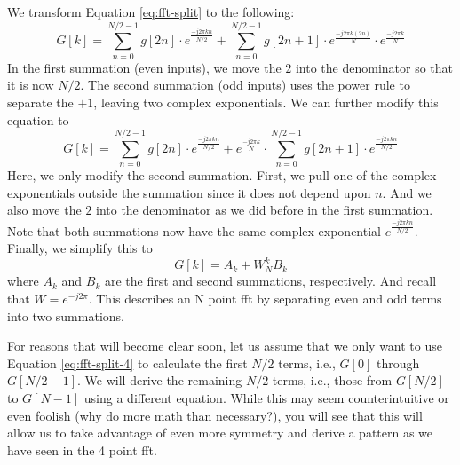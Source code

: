 We transform Equation \ref{eq:fft-split} to the following:
\begin{equation}
G[k] = \displaystyle\sum\limits_{n=0}^{N/2-1} g[2n] \cdot e^{\frac{-j 2 \pi k n}{N/2}} + \displaystyle\sum\limits_{n=0}^{N/2-1} g[2n+1] \cdot e^{\frac{-j 2 \pi k (2n)}{N}} \cdot e^{\frac{-j 2 \pi k}{N}}
\label{eq:fft-split-2}
\end{equation}
In the first summation (even inputs), we move the $2$ into the denominator so that it is now $N/2$. The second summation (odd inputs) uses the power rule to separate the $+1$, leaving two complex exponentials. We can further modify this equation to
\begin{equation}
G[k] = \displaystyle\sum\limits_{n=0}^{N/2-1} g[2n] \cdot e^{\frac{-j 2 \pi k n}{N/2}} + e^{\frac{-j 2 \pi k}{N}} \cdot \displaystyle\sum\limits_{n=0}^{N/2-1} g[2n+1] \cdot e^{\frac{-j 2 \pi k n}{N/2}} 
\label{eq:fft-split-3}
\end{equation}
Here, we only modify the second summation. First, we pull one of the complex exponentials outside the summation since it does not depend upon $n$. And we also move the $2$ into the denominator as we did before in the first summation. Note that both summations now have the same complex exponential $e^{\frac{-j 2 \pi k n}{N/2}}$. Finally, we simplify this to 
\begin{equation}
G[k] = A_k + W_N^k B_k 
\label{eq:fft-split-4}
\end{equation} where $A_k$ and $B_k$ are the first and second summations, respectively. And recall that $W = e^{-j 2 \pi}$. This describes an N point \gls{fft} by separating even and odd terms into two summations.

For reasons that will become clear soon, let us assume that we only want to use Equation \ref{eq:fft-split-4} to calculate the first $N/2$ terms, i.e., $G[0]$ through $G[N/2 -1]$. We will derive the remaining $N/2$ terms, i.e., those from $G[N/2]$ to $G[N-1]$ using a different equation. While this may seem counterintuitive or even foolish (why do more math than necessary?), you will see that this will allow us to take advantage of even more symmetry and derive a pattern as we have seen in the 4 point \gls{fft}.

